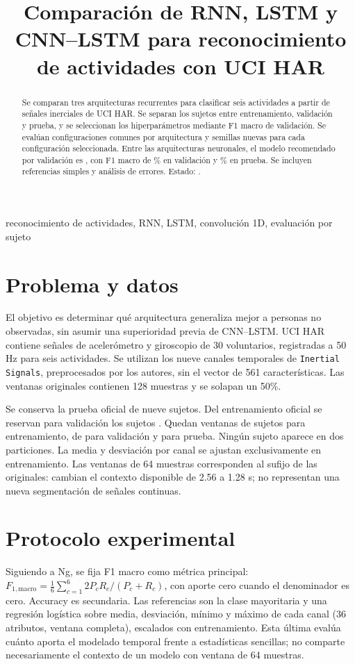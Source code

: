 \documentclass[conference]{IEEEtran}
\title{Comparación de RNN, LSTM y CNN--LSTM para reconocimiento de actividades con UCI HAR}
\author{\IEEEauthorblockN{Nombre del estudiante}
\IEEEauthorblockA{Universidad -- Curso de Deep Learning}}
\begin{document}
\maketitle
\begin{abstract}
Se comparan tres arquitecturas recurrentes para clasificar seis actividades a partir de señales inerciales de UCI HAR. Se separan los sujetos entre entrenamiento, validación y prueba, y se seleccionan los hiperparámetros mediante F1 macro de validación. Se evalúan \Trials{} configuraciones comunes por arquitectura y \Seeds{} semillas nuevas para cada configuración seleccionada. Entre las arquitecturas neuronales, el modelo recomendado por validación es \Winner{}, con F1 macro de \WinnerDev\% en validación y \WinnerTest\% en prueba. Se incluyen referencias simples y análisis de errores. Estado: \RunLabel.
\end{abstract}
\begin{IEEEkeywords}
reconocimiento de actividades, RNN, LSTM, convolución 1D, evaluación por sujeto
\end{IEEEkeywords}

\section{Problema y datos}
El objetivo es determinar qué arquitectura generaliza mejor a personas no observadas, sin asumir una superioridad previa de CNN--LSTM. UCI HAR contiene señales de acelerómetro y giroscopio de 30 voluntarios, registradas a 50 Hz para seis actividades\cite{har}. Se utilizan los nueve canales temporales de \texttt{Inertial Signals}, preprocesados por los autores, sin el vector de 561 características. Las ventanas originales contienen 128 muestras y se solapan un 50\%.

Se conserva la prueba oficial de nueve sujetos. Del entrenamiento oficial se reservan para validación los sujetos \DevSubjectList. Quedan \TrainN{} ventanas de \TrainSubjects{} sujetos para entrenamiento, \DevN{} de \DevSubjects{} para validación y \TestN{} para prueba. Ningún sujeto aparece en dos particiones. La media y desviación por canal se ajustan exclusivamente en entrenamiento. Las ventanas de 64 muestras corresponden al sufijo de las originales: cambian el contexto disponible de 2.56 a 1.28 s; no representan una nueva segmentación de señales continuas.

\section{Protocolo experimental}
Siguiendo a Ng\cite{ng}, se fija F1 macro como métrica principal:
$F_{1,\mathrm{macro}}=\frac{1}{6}\sum_{c=1}^{6}2P_cR_c/(P_c+R_c)$,
con aporte cero cuando el denominador es cero. Accuracy es secundaria. Las referencias son la clase mayoritaria y una regresión logística sobre media, desviación, mínimo y máximo de cada canal (36 atributos, ventana completa), escalados con entrenamiento. Esta última evalúa cuánto aporta el modelado temporal frente a estadísticas sencillas; no comparte necesariamente el contexto de un modelo con ventana de 64 muestras.
\end{document}
